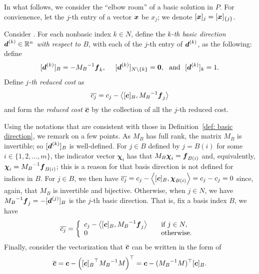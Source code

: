 In what follows, we consider the ``elbow room'' of a basic solution in $P$. For convienence, let the $j$-th entry of a vector ${\boldsymbol x}$ be $x_j$; we denote $ [{\boldsymbol x}]_j = [{\boldsymbol x}]_{\{j\}} $. 

\begin{definition}\label{def: basic direction}
Consider \LPSA. For each nonbasic index $k\in N$, define the {\em $k$-th basic direction ${\boldsymbol d}^{(k)} \in \mathbb R^n$ with respect to $B$}, with each of the $j$-th entry of ${\boldsymbol d}^{(k)}$, as the following: define  
\[[{\boldsymbol d}^{(k)}]_B = - {M_B}^{-1} {\boldsymbol f}_k, ~~\text{}~~ 
[{\boldsymbol d}^{(k)}]_{N \setminus \{k\}} = \boldsymbol 0, ~~\text{and}~~ 
[{\boldsymbol d}^{(k)}]_k = 1.\] 
Define {\em $j$-th reduced cost} as \[\overline{c_j} = c_j - \left\langle[{\boldsymbol c}]_B, {M_B}^{-1} {\boldsymbol f}_j\right\rangle \] and form the {\em reduced cost $\overline{{\boldsymbol c}}$} by the collection of all the $j$-th reduced cost. 
\end{definition}

Using the notations that are consistent with those in Definition~\ref{def: basic direction}, we remark on a few points. As $M_B$ has full rank, the matrix $M_B$ is invertible; so $[{\boldsymbol d}^{(k)}]_B$ is well-defined. For $j\in B$ defined by $j = B(i)$ for some $i\in\{1,2, \dots, m\}$, the indicator vector $\bm\chi_i$ has that $M_B \boldsymbol\chi_i = {\boldsymbol f}_{B(i)}$ and, equivalently, $ \boldsymbol\chi_i = {M_B}^{-1}{\boldsymbol f}_{B(i)}$; this is a reason for that basis direction is not defined for indices in $B$. For $j \in B$, we then have $\overline{c_j} = c_j - \left\langle[{\boldsymbol c}]_B, \boldsymbol\chi_{B(i)}\right\rangle = c_j - c_j = 0$ since, again, that $M_B$ is invertible and bijective. 
Otherwise, when $j \in N$, we have $ {M_B}^{-1} {\boldsymbol f}_j = - [{\boldsymbol d}^{(j)}]_B$ is the $j$-th basic direction. That is, fix a basis index $B$, we have 
\[ \overline{c_j} = \left\{\begin{array}{ll}
c_j -  \left\langle[{\boldsymbol c}]_B, {M_B}^{-1} {\boldsymbol f}_j \right\rangle  & \quad \text{if } j\in N, \\
 0 & \quad\text{otherwise. }
\end{array}\right. \]
Finally, consider the vectorization that $\overline{{\boldsymbol c}}$ can be written in the form of 
\[ \overline{{\boldsymbol c}} = {\boldsymbol c} - \left({[{\boldsymbol c}]_B}^\top {M_B}^{-1} M\right)^\top = {\boldsymbol c} -  ({M_B}^{-1} M )^\top [{\boldsymbol c}]_B . \]


